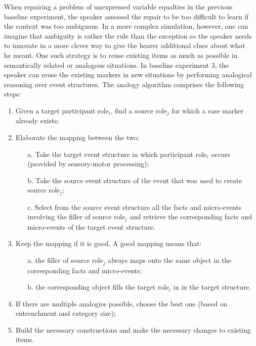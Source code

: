 When repairing a problem of unexpressed variable equalties in the previous baseline experiment, the speaker assessed the repair to be too difficult to learn if the context was too ambiguous. In a more complex simulation, however, one can imagine that ambiguity is rather the rule than the exception so the speaker needs to innovate in a more clever way to give the hearer additional clues about what he meant. One such strategy is to reuse existing items as much as possible in semantically related or analogous situations. In baseline experiment 3, the speaker can reuse the existing markers in new situations by performing analogical reasoning over event structures. The analogy algorithm comprises the following steps:

\begin{enumerate}
\item Given a target participant role$_{i}$, find a source role$_{j}$ for which a case marker already exists;
\item Elaborate the mapping between the two:
\begin{enumerate}
\item[a.] Take the target event structure in which participant role$_{i}$ occurs (provided by sensory-motor processing);
\item[b.] Take the source event structure of the event that was used to create source role$_{j}$;
\item[c.] Select from the source event structure all the facts and micro-events involving the filler of source role$_{j}$ and retrieve the corresponding facts and micro-events of the target event structure. 
\end{enumerate}
\item Keep the mapping if it is good. A good mapping means that:
\begin{enumerate}
\item[a.] the filler of source role$_{j}$ always maps onto the same object in the corresponding facts and micro-events;
\item[b.] the corresponding object fills the target role$_{i}$ in in the target structure.
\end{enumerate}
\item If there are multiple analogies possible, choose the best one (based on entrenchment and category size);
\item Build the necessary constructions and make the necessary changes to existing items.
\end{enumerate}

